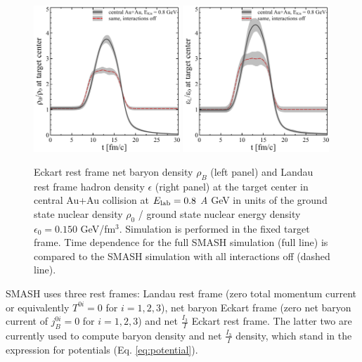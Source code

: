 \begin{figure}
  \includegraphics[width=0.49\textwidth]{plots/smash/thermodynamics/density_at_target_center_AuAu_Ekin08GeV_fixed_target.pdf}
  \includegraphics[width=0.49\textwidth]{plots/smash/thermodynamics/e_at_target_center_AuAu_Ekin08GeV_fixed_target.pdf}

  \caption{Eckart rest frame net baryon density $\rho_B$ (left panel) and
           Landau rest frame hadron density $\epsilon$ (right panel) at the
           target center in central Au+Au collision at $E_\mathrm{lab} = 0.8$ \emph{A} GeV
           in units of the ground state nuclear density $\rho_0$ / ground state nuclear
           energy density $\epsilon_0 = 0.150$ GeV/fm$^3$. Simulation is performed in
           the fixed target frame. Time dependence for the full SMASH simulation (full
           line) is compared to the SMASH simulation with all interactions off (dashed
           line).}
  \label{fig:density:AuAu}
\end{figure}

SMASH uses three rest frames: Landau rest frame (zero total momentum current or
equivalently $T^{0i} = 0$ for $i = 1,2,3$), net baryon Eckart frame (zero
net baryon current of $j_B^{0i} = 0$ for $i = 1,2,3$) and net $\frac{I_3}{I}$
Eckart rest frame. The latter two are currently used to compute baryon density
and net $\frac{I_3}{I}$ density, which stand in the expression for potentials
 (Eq. \ref{eq:potential}).

